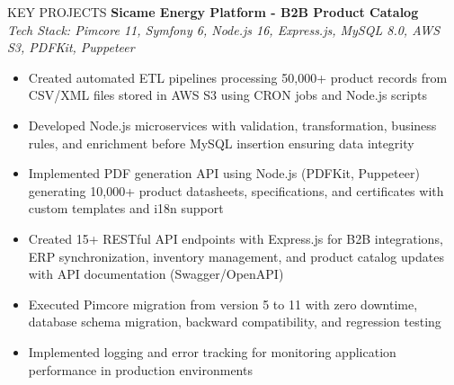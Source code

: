 \documentclass{resume} %
\begin{document}
\begin{rSection}{KEY PROJECTS}
\textbf{Sicame Energy Platform - B2B Product Catalog}\\
\textit{Tech Stack: Pimcore 11, Symfony 6, Node.js 16, Express.js, MySQL 8.0, AWS S3, PDFKit, Puppeteer}
\begin{itemize}
    \itemsep -3pt {}
    \item Created automated ETL pipelines processing 50,000+ product records from CSV/XML files stored in AWS S3 using CRON jobs and Node.js scripts
    \item Developed Node.js microservices with validation, transformation, business rules, and enrichment before MySQL insertion ensuring data integrity
    \item Implemented PDF generation API using Node.js (PDFKit, Puppeteer) generating 10,000+ product datasheets, specifications, and certificates with custom templates and i18n support
    \item Created 15+ RESTful API endpoints with Express.js for B2B integrations, ERP synchronization, inventory management, and product catalog updates with API documentation (Swagger/OpenAPI)
    \item Executed Pimcore migration from version 5 to 11 with zero downtime, database schema migration, backward compatibility, and regression testing
    \item Implemented logging and error tracking for monitoring application performance in production environments
\end{itemize}

\vspace{0.5em}


\end{rSection}
\end{document}
